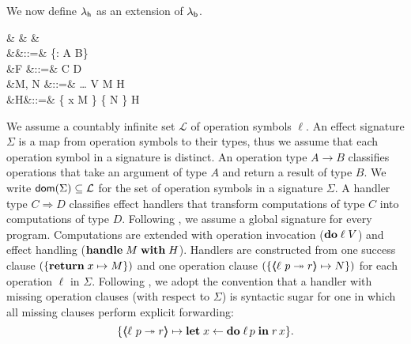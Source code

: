 \documentclass[12pt,phd,lfcs,twoside,openright,logo,leftchapter,normalheadings]{infthesis}
\theoremstyle{plain}
\theoremstyle{definition}
\begin{document}
We now define $\lambda_{\mathsf{h}}$ as an extension of $\lambda_{\mathsf{b}}$.
%
{
\begin{syntax}
 &\ell \in {} & & \\
        &\Sigma&::=& \cdot \mid \{\ell : A \to B\} \cup \Sigma\\
     &F     &::=& C \Rightarrow D\\
 &M, N &::=& \dots \mid \Do \; \ell \; V
                          \mid  \Handle \; M \; \With \; H \\
     &H&::=& \{ \Return \; x \mapsto M \}
                      \mid  \{  \mapsto N \} \uplus H\\
\end{syntax}}%
%
We assume a countably infinite set $\mathcal{L}$ of operation symbols
$\ell$.
%
An effect signature $\Sigma$ is a map from operation symbols to their
types, thus we assume that each operation symbol in a signature is
distinct. An operation type $A \to B$ classifies operations that take
an argument of type $A$ and return a result of type $B$.
%
We write $\mathsf{dom}(\Sigma) \subseteq \mathcal{L}$ for the set of operation
symbols in a signature $\Sigma$.
%
A handler type $C \Rightarrow D$ classifies effect handlers that
transform computations of type $C$ into computations of type $D$.
%
Following \citet{Pretnar15}, we assume a global signature for every
program.
%
Computations are extended with operation invocation ($\mathbf{do}\;\ell\;V$)
and effect handling ($\mathbf{handle}\; M \;\mathbf{with}\; H$).
%
Handlers are constructed from one success clause $(\{\mathbf{return}\; x \mapsto
M\})$ and one operation clause $(\{ \langle\!\!\langle \ell~p \twoheadrightarrow r \rangle\!\!\rangle \mapsto N \})$ for
each operation $\ell$ in $\Sigma$.
%
Following \citet{PlotkinP13}, we adopt the convention that a handler
with missing operation clauses (with respect to $\Sigma$) is syntactic
sugar for one in which all missing clauses perform explicit
forwarding:
%
\[
   \{\langle\!\!\langle \ell~p \twoheadrightarrow r \rangle\!\!\rangle \mapsto \mathbf{let}\; x \leftarrow \mathbf{do} \; \ell \, p \;\mathbf{in}\; r \, x\}.
\]
\end{document}
